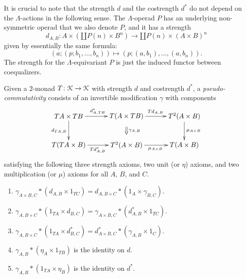 \begin{rem}
It is crucial to note that the strength $d$ and the costrength $d^{*}$ do not depend on the $\Lambda$-actions in the following sense. The $\Lambda$-operad $P$ has an underlying non-symmetric operad that we also denote $P$, and it has a strength
  \[
    d_{A,B} \colon A \times \left(\amalg P(n) \times B^n\right) \rightarrow \amalg P(n) \times \left(A \times B \right)^n
  \]
given by essentially the same formula:
  \[
    \left( a; (p; b_{1}, \ldots, b_{n}) \right) \mapsto \left(p; (a,b_{1}), \ldots, (a, b_{n})\right).
  \]
The strength for the $\Lambda$-equivariant $P$ is just the induced functor between coequalizers.
\end{rem}

\begin{Defi}
    Given a $2$-monad $T \colon \mathcal{K} \rightarrow \mathcal{K}$ with strength $d$ and costrength $d^{\ast}$, a \textit{pseudo-commutativity} consists of an invertible modification $\gamma$ with components
      \[
        \xy
            (0,0)*+{TA \times TB}="00";
            (30,0)*+{T(A \times TB)}="10";
            (60,0)*+{T^2(A \times B)}="20";
            (0,-15)*+{T(TA \times B)}="01";
            (30,-15)*+{T^2(A \times B)}="11";
            (60,-15)*+{T(A \times B)}="21";
            {\ar^{d^{\ast}_{A,TB}} "00" ; "10"};
            {\ar^{Td_{A,B}} "10" ; "20"};
            {\ar^{\mu_{A \times B}} "20" ; "21"};
            {\ar_{d_{TA,B}} "00" ; "01"};
            {\ar_{Td^{\ast}_{A,B}} "01" ; "11"};
            {\ar_{\mu_{A \times B}} "11" ; "21"};
            {\ar@{=>}^{\gamma_{A,B}} (30,-5.5) ; (30,-9.5)};
        \endxy
      \]
satisfying the following three strength axioms, two unit (or $\eta$) axioms, and two multiplication (or $\mu$) axioms for all $A$, $B$, and $C$.
    \begin{enumerate}
        \item\label{axiom:ps_comm_str_1} $\gamma_{A \times B,C} * (d_{A,B} \times 1_{TC}) = d_{A,B \times C} * (1_A \times \gamma_{B,C})$.
        \item\label{axiom:ps_comm_str_2} $\gamma_{A,B \times C} * (1_{TA} \times d_{B,C}) = \gamma_{A \times B, C} * (d^{\ast}_{A,B} \times 1_{TC})$.
        \item\label{axiom:ps_comm_str_3} $\gamma_{A,B \times C} * (1_{TA} \times d^{\ast}_{B,C}) = d^{\ast}_{A \times B,C} * (\gamma_{A,B} \times 1_{C})$.
        \item\label{axiom:ps_comm_unit_1} $\gamma_{A,B} * (\eta_A \times 1_{TB})$  is the identity on $d$.
        \item\label{axiom:ps_comm_unit_2} $\gamma_{A,B} * (1_{TA} \times \eta_B)$ is the identity on $d^{*}$.

\end{enumerate}
\end{Defi}
